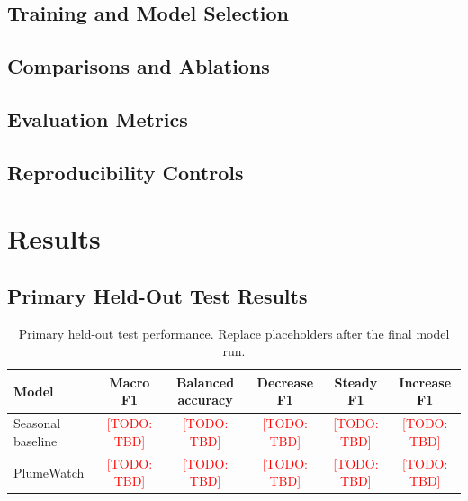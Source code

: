 \documentclass[11pt]{article}
\newcommand{\todo}[1]{\textcolor{red}{[TODO: #1]}}
\newcommand{\modelname}{PlumeWatch}
\begin{document}
\subsection{Training and Model Selection}

\subsection{Comparisons and Ablations}

\subsection{Evaluation Metrics}

\subsection{Reproducibility Controls}

\section{Results}
\label{sec:results}

\subsection{Primary Held-Out Test Results}

\begin{table}[t]
  \centering
  \caption{Primary held-out test performance. Replace placeholders after the
  final model run.}
  \label{tab:primary-results}
  \begin{tabular}{lccccc}
    \toprule
    Model & Macro F1 & Balanced accuracy & Decrease F1 & Steady F1 & Increase F1 \\
    \midrule
    Seasonal baseline & \todo{TBD} & \todo{TBD} & \todo{TBD} & \todo{TBD} & \todo{TBD} \\
    \modelname{} & \todo{TBD} & \todo{TBD} & \todo{TBD} & \todo{TBD} & \todo{TBD} \\
    \bottomrule
  \end{tabular}
\end{table}
\end{document}
